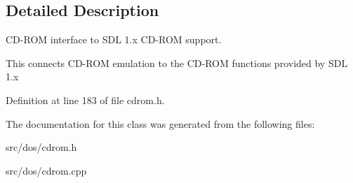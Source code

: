 \subsection{Detailed Description}
C\-D-\/\-R\-O\-M interface to S\-D\-L 1.\-x C\-D-\/\-R\-O\-M support. 

This connects C\-D-\/\-R\-O\-M emulation to the C\-D-\/\-R\-O\-M functions provided by S\-D\-L 1.\-x 

Definition at line 183 of file cdrom.\-h.



The documentation for this class was generated from the following files\-:\begin{DoxyCompactItemize}
\item 
src/dos/cdrom.\-h\item 
src/dos/cdrom.\-cpp\end{DoxyCompactItemize}
